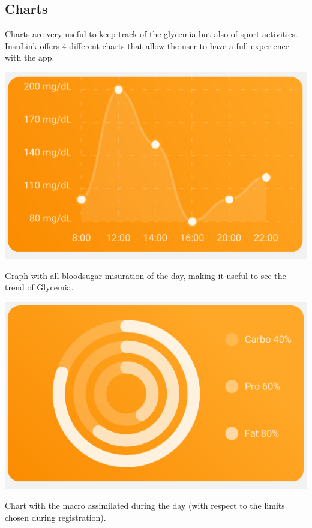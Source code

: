 \documentclass[12pt,hidelinks]{article}
\begin{document}
	\subsection{Charts}
	Charts are very useful to keep track of the glycemia but also of sport activities. InsuLink offers
	4 different charts that allow the user to have a full experience with the app.
	\begin{center}
		\includegraphics[scale=1]{screenshotC}
	\end{center}
	Graph with all bloodsugar misuration of the day, making it useful to see the trend of Glycemia.
	\begin{center}
		\includegraphics[scale=1]{screenshotD}
	\end{center}
    Chart with the macro assimilated during the day (with respect to the limits chosen during registration).
	\newpage
\end{document}
